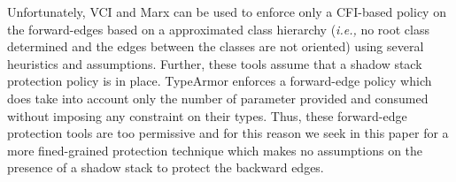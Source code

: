
Unfortunately, VCI and Marx can be used to enforce only a CFI-based policy on the forward-edges based on a approximated class hierarchy  
(\textit{i.e.,} no root class determined and the edges between the classes are not oriented) using several heuristics and assumptions. Further, these tools assume
that a shadow stack protection policy is in place. TypeArmor enforces a forward-edge policy which does take into account only the number of parameter 
provided and consumed without imposing any constraint on their types. Thus, these forward-edge protection tools are too permissive and for this reason we seek 
in this paper for a more fined-grained protection technique which makes no assumptions on the presence of a shadow stack to protect the backward edges.

